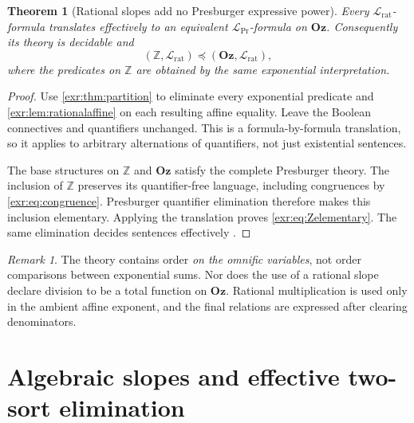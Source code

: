 \documentclass[11pt,letterpaper]{article}
\numberwithin{equation}{section}
\newtheorem{theorem}{Theorem}[section]
\theoremstyle{definition}
\theoremstyle{remark}
\newtheorem{remark}[remark]{Remark}
\newcommand{\Oz}{\mathbf{Oz}}
\newcommand{\Z}{\mathbb Z}
\newcommand{\Lrat}{\mathcal L_{\mathrm{rat}}}
\newcommand{\LPr}{\mathcal L_{\mathrm{Pr}}}
\begin{document}
\begin{theorem}[Rational slopes add no Presburger expressive power]\label{exr:thm:rational}
Every $\Lrat$-formula translates effectively to an equivalent $\LPr$-formula on
$\Oz$. Consequently its theory is decidable and
\begin{equation}\label{exr:eq:Zelementary}
 (\Z,\Lrat)\preccurlyeq(\Oz,\Lrat),
\end{equation}
where the predicates on $\Z$ are obtained by the same exponential interpretation.
\end{theorem}
\begin{proof}
Use \cref{exr:thm:partition} to eliminate every exponential predicate and
\cref{exr:lem:rationalaffine} on each resulting affine equality. Leave the Boolean
connectives and quantifiers unchanged. This is a formula-by-formula translation,
so it applies to arbitrary alternations of quantifiers, not just existential
sentences.

The base structures on $\Z$ and $\Oz$ satisfy the complete Presburger theory.
The inclusion of $\Z$ preserves its quantifier-free language, including congruences
by \eqref{exr:eq:congruence}. Presburger quantifier elimination therefore makes this
inclusion elementary. Applying the translation proves \eqref{exr:eq:Zelementary}.
The same elimination decides sentences effectively \cite{cluckers}.
\end{proof}

\begin{remark}
The theory contains order \emph{on the omnific variables}, not order comparisons
between exponential sums. Nor does the use of a rational slope declare division
to be a total function on $\Oz$. Rational multiplication is used only in the
ambient affine exponent, and the final relations are expressed after clearing
denominators.
\end{remark}

\section{Algebraic slopes and effective two-sort elimination}\label{exr:sec:algebraic}
\end{document}
